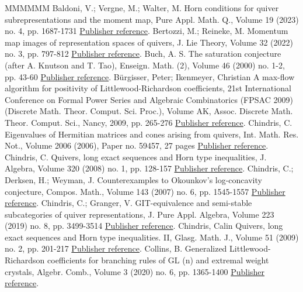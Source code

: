\begin{thebibliography}{MMMMMM}
 Baldoni, V.; Vergne, M.; Walter, M. Horn conditions for quiver subrepresentations and the moment map, Pure Appl. Math. Q., Volume 19 (2023) no. 4, pp. 1687-1731 \href{https://alco.centre-mersenne.org/articles/10.5802/alco.398/#Bal-Ver-Wal-2023}{Publisher reference}.
 Bertozzi, M.; Reineke, M. Momentum map images of representation spaces of quivers, J. Lie Theory, Volume 32 (2022) no. 3, pp. 797-812 \href{https://alco.centre-mersenne.org/articles/10.5802/alco.398/#Ber-Rei-2022}{Publisher reference}.
 Buch, A. S. The saturation conjecture (after A. Knutson and T. Tao), Enseign. Math. (2), Volume 46 (2000) no. 1-2, pp. 43-60 \href{https://alco.centre-mersenne.org/articles/10.5802/alco.398/#Buch-2000}{Publisher reference}.
 Bürgisser, Peter; Ikenmeyer, Christian A max-flow algorithm for positivity of Littlewood-Richardson coefficients, 21st International Conference on Formal Power Series and Algebraic Combinatorics (FPSAC 2009) (Discrete Math. Theor. Comput. Sci. Proc.), Volume AK, Assoc. Discrete Math. Theor. Comput. Sci., Nancy, 2009, pp. 265-276 \href{https://alco.centre-mersenne.org/articles/10.5802/alco.398/#BI}{Publisher reference}.
 Chindris, C. Eigenvalues of Hermitian matrices and cones arising from quivers, Int. Math. Res. Not., Volume 2006 (2006), Paper no. 59457, 27 pages \href{https://alco.centre-mersenne.org/articles/10.5802/alco.398/#CC4}{Publisher reference}.
 Chindris, C. Quivers, long exact sequences and Horn type inequalities, J. Algebra, Volume 320 (2008) no. 1, pp. 128-157 \href{https://alco.centre-mersenne.org/articles/10.5802/alco.398/#CC1}{Publisher reference}.
 Chindris, C.; Derksen, H.; Weyman, J. Counterexamples to Okounkov’s log-concavity conjecture, Compos. Math., Volume 143 (2007) no. 6, pp. 1545-1557 \href{https://alco.centre-mersenne.org/articles/10.5802/alco.398/#CDW}{Publisher reference}.
 Chindris, C.; Granger, V. GIT-equivalence and semi-stable subcategories of quiver representations, J. Pure Appl. Algebra, Volume 223 (2019) no. 8, pp. 3499-3514 \href{https://alco.centre-mersenne.org/articles/10.5802/alco.398/#ChiGra-2019}{Publisher reference}.
 Chindris, Calin Quivers, long exact sequences and Horn type inequalities. II, Glasg. Math. J., Volume 51 (2009) no. 2, pp. 201-217 \href{https://alco.centre-mersenne.org/articles/10.5802/alco.398/#CC2}{Publisher reference}.
 Collins, B. Generalized Littlewood-Richardson coefficients for branching rules of  GL (n) and extremal weight crystals, Algebr. Comb., Volume 3 (2020) no. 6, pp. 1365-1400 \href{https://alco.centre-mersenne.org/articles/10.5802/alco.398/#Col20}{Publisher reference}.

\end{thebibliography}
